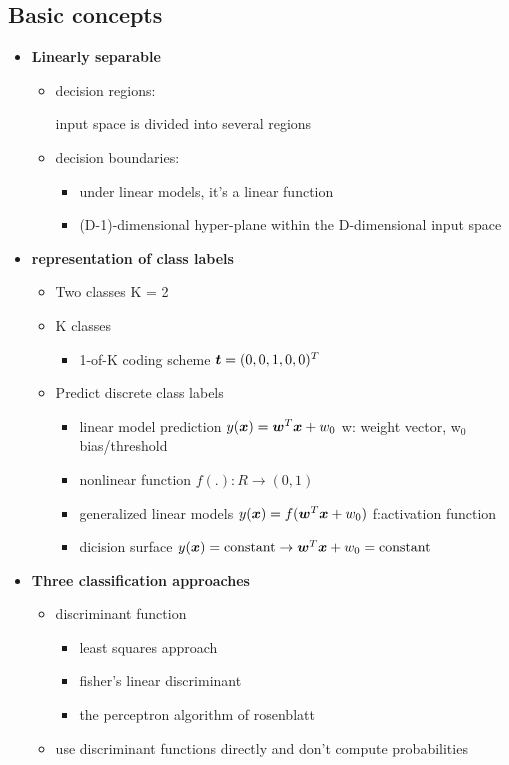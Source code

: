 \documentclass[11pt]{article}
\begin{document}
\subsection{Basic concepts}
\label{sec:orgefdfcef}
\begin{itemize}
\item \textbf{Linearly separable}
\begin{itemize}
\item decision regions:

input space is divided into several regions
\item decision boundaries:
\begin{itemize}
\item under linear models, it's a linear function
\item (D-1)-dimensional hyper-plane within the D-dimensional input space
\end{itemize}
\end{itemize}
\item \textbf{representation of class labels}
\begin{itemize}
\item Two classes K = 2
\item K classes
\begin{itemize}
\item 1-of-K coding scheme \(\boldsymbol{t}=(0,0,1,0,0)^T\)
\end{itemize}
\item Predict discrete class labels
\begin{itemize}
\item linear model prediction \(y(\boldsymbol{x})=\boldsymbol{w}^T\boldsymbol{x}+w_0\)
w: weight vector, w\(_{\text{0}}\) bias/threshold
\item nonlinear function \(f(.):R\to(0,1)\)
\item generalized linear models
\(y(\boldsymbol{x})=f(\boldsymbol{w}^T\boldsymbol{x}+w_0)\)
f:activation function
\item dicision surface
\(y(\boldsymbol{x})=\text{constant}\to \boldsymbol{w}^T\boldsymbol{x}+w_0=\text{constant}\)
\end{itemize}
\end{itemize}
\item \textbf{Three classification approaches}
\begin{itemize}
\item discriminant function
\begin{itemize}
\item least squares approach
\item fisher's linear discriminant
\item the perceptron algorithm of rosenblatt
\end{itemize}
\item use discriminant functions directly and don't compute probabilities


\end{itemize}
\end{itemize}
\end{document}

